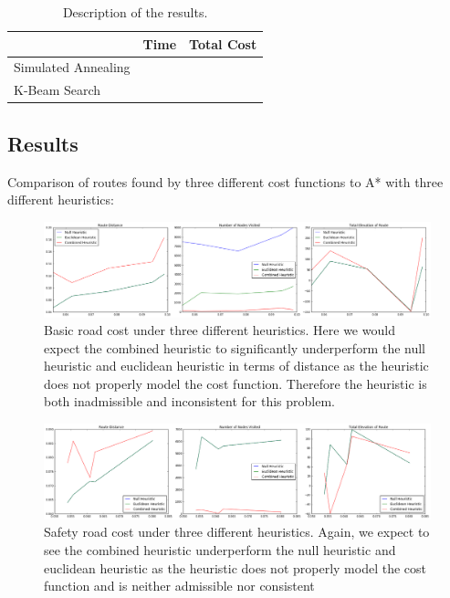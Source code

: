\documentclass[11pt]{article}
\begin{document}
\begin{table}[H]
  \centering
  \begin{tabular}{lll}
    \toprule
    & Time & Total Cost \\
    \midrule 
    Simulated Annealing & &\\
    K-Beam Search & &\\
    \bottomrule
  \end{tabular}
  \caption{Description of the results.}
\end{table}


\subsection{Results}\label{results}

Comparison of routes found by three different cost functions to A* with three different heuristics: \\

\begin{figure}[H]
\caption{Basic road cost under three different heuristics. Here we would expect the combined heuristic to significantly underperform the null heuristic and euclidean heuristic in terms of distance as the heuristic does not properly model the cost function. Therefore the heuristic is both inadmissible and inconsistent for this problem. }
\includegraphics[width=1\textwidth]{../images/cost_1.png}
\end{figure}

\begin{figure}[H]
\caption{Safety road cost under three different heuristics. Again, we expect to see the combined heuristic underperform the null heuristic and euclidean heuristic as the heuristic does not properly model the cost function and is neither admissible nor consistent }
\includegraphics[width=1\textwidth]{../images/cost_2.png}
\end{figure}
\end{document}
